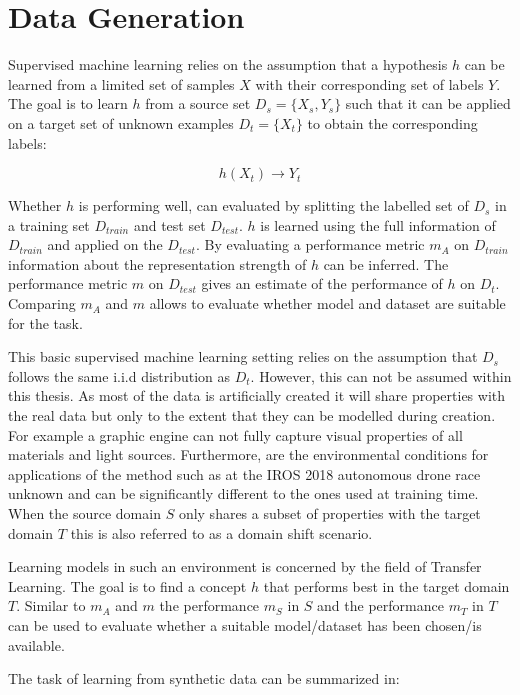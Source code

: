 \chapter{Data Generation}
\label{sec:training}

Supervised machine learning relies on the assumption that a hypothesis $h$ can be learned from a limited set of samples $X$ with their corresponding set of labels $Y$. The goal is to learn $h$ from a source set $D_s = \{X_{s},Y_{s}\}$ such that it can be applied on a target set of unknown examples $D_t = \{X_{t}\}$ to obtain the corresponding labels:

$$
h(X_t)\rightarrow Y_t
$$ 

Whether $h$ is performing well, can evaluated by splitting the labelled set of $D_s$ in a training set $D_{train}$ and test set $D_{test}$. $h$ is learned using the full information of $D_{train}$ and applied on the $D_{test}$. By evaluating a performance metric $m_A$ on $D_{train}$ information about the representation strength of $h$ can be inferred. The performance metric $m$ on $D_{test}$ gives an estimate of the performance of $h$ on $D_t$. Comparing $m_A$ and $m$ allows to evaluate whether model and dataset are suitable for the task.
			
This basic supervised machine learning setting relies on the assumption that $D_s$ follows the same i.i.d distribution as $D_t$. However, this can not be assumed within this thesis. As most of the data is artificially created it will share properties with the real data but only to the extent that they can be modelled during creation. For example a graphic engine can not fully capture visual properties of all materials and light sources. Furthermore, are the environmental conditions for applications of the method such as at the IROS 2018 autonomous drone race unknown and can be significantly different to the ones used at training time. When the source domain $S$ only shares a subset of properties with the target domain $T$ this is also referred to as a domain shift scenario.

Learning models in such an environment is concerned by the field of Transfer Learning. The goal is to find a concept $h$ that performs best in the target domain $T$. Similar to $m_A$ and $m$ the performance $m_S$ in $S$ and the performance $m_T$ in $T$ can be used to evaluate whether a suitable model/dataset has been chosen/is available.

The task of learning from synthetic data can be summarized in:

